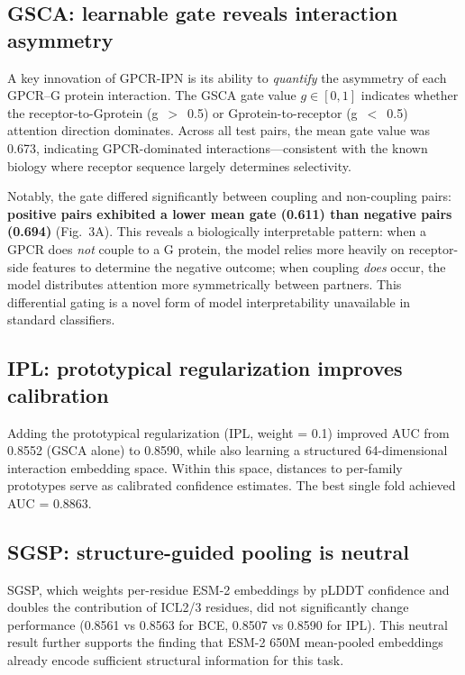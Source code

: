 \documentclass[unnumsec,webpdf,contemporary,large,numbered]{oup-authoring-template}
\begin{document}
\subsection{GSCA: learnable gate reveals interaction asymmetry}

A key innovation of GPCR-IPN is its ability to \textit{quantify} the asymmetry of each GPCR--G protein interaction. The GSCA gate value $g \in [0,1]$ indicates whether the receptor-to-Gprotein (g~$>$~0.5) or Gprotein-to-receptor (g~$<$~0.5) attention direction dominates. Across all test pairs, the mean gate value was 0.673, indicating GPCR-dominated interactions---consistent with the known biology where receptor sequence largely determines selectivity.

Notably, the gate differed significantly between coupling and non-coupling pairs: \textbf{positive pairs exhibited a lower mean gate (0.611) than negative pairs (0.694)} (Fig.~3A). This reveals a biologically interpretable pattern: when a GPCR does \textit{not} couple to a G protein, the model relies more heavily on receptor-side features to determine the negative outcome; when coupling \textit{does} occur, the model distributes attention more symmetrically between partners. This differential gating is a novel form of model interpretability unavailable in standard classifiers.

\subsection{IPL: prototypical regularization improves calibration}

Adding the prototypical regularization (IPL, weight = 0.1) improved AUC from 0.8552 (GSCA alone) to 0.8590, while also learning a structured 64-dimensional interaction embedding space. Within this space, distances to per-family prototypes serve as calibrated confidence estimates. The best single fold achieved AUC = 0.8863.

\subsection{SGSP: structure-guided pooling is neutral}

SGSP, which weights per-residue ESM-2 embeddings by pLDDT confidence and doubles the contribution of ICL2/3 residues, did not significantly change performance (0.8561 vs 0.8563 for BCE, 0.8507 vs 0.8590 for IPL). This neutral result further supports the finding that ESM-2 650M mean-pooled embeddings already encode sufficient structural information for this task.
\end{document}
